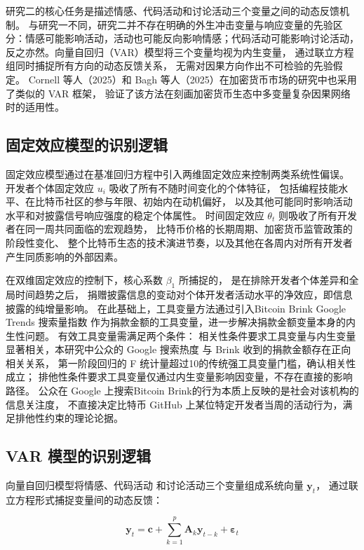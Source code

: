 \documentclass[
    type = master, %
    degree = professional,        %
    decl-page,  %
    twoside,                %
    fontset = fandol %
  ]{njuthesis}
\begin{document}
研究二的核心任务是描述情感、代码活动和讨论活动三个变量之间的动态反馈机制。
与研究一不同，研究二并不存在明确的外生冲击变量与响应变量的先验区分：情感可能影响活动，活动也可能反向影响情感；代码活动可能影响讨论活动，反之亦然。向量自回归（VAR）模型将三个变量均视为内生变量，
通过联立方程组同时捕捉所有方向的动态反馈关系，
无需对因果方向作出不可检验的先验假定\cite{sims1980macroeconomics}。
Cornell 等人（2025）\cite{cornell2025vector}和 Bagh 等人（2025）\cite{bagh2025investor}在加密货币市场的研究中也采用了类似的 VAR 框架，
验证了该方法在刻画加密货币生态中多变量复杂因果网络时的适用性\cite{cornell2025vector}。

\subsection{固定效应模型的识别逻辑}

固定效应模型通过在基准回归方程中引入两维固定效应来控制两类系统性偏误。
开发者个体固定效应 $u_i$ 吸收了所有不随时间变化的个体特征，
包括编程技能水平、在比特币社区的参与年限、初始内在动机偏好，
以及其他可能同时影响活动水平和对披露信号响应强度的稳定个体属性。
时间固定效应 $\theta_t$ 则吸收了所有开发者在同一周共同面临的宏观趋势，
比特币价格的长期周期、加密货币监管政策的阶段性变化、
整个比特币生态的技术演进节奏，以及其他在各周内对所有开发者产生同质影响的外部因素。

在双维固定效应的控制下，核心系数 $\beta_1$ 所捕捉的，
是在排除开发者个体差异和全局时间趋势之后，
捐赠披露信息的变动对个体开发者活动水平的净效应，即信息披露的纯增量影响。
在此基础上，工具变量方法通过引入Bitcoin Brink Google Trends 搜索量指数
作为捐款金额的工具变量，进一步解决捐款金额变量本身的内生性问题。
有效工具变量需满足两个条件：
相关性条件要求工具变量与内生变量显著相关，本研究中公众的 Google 搜索热度
与 Brink 收到的捐款金额存在正向相关关系，
第一阶段回归的 F 统计量超过10的传统强工具变量门槛，确认相关性成立；
排他性条件要求工具变量仅通过内生变量影响因变量，不存在直接的影响路径。
公众在 Google 上搜索Bitcoin Brink的行为本质上反映的是社会对该机构的信息关注度，
不直接决定比特币 GitHub 上某位特定开发者当周的活动行为，满足排他性约束的理论论据。

\subsection{VAR 模型的识别逻辑}

向量自回归模型将情感、代码活动
和讨论活动三个变量组成系统向量 $\mathbf{y}_t$，
通过联立方程形式捕捉变量间的动态反馈：

\begin{equation}
\label{eq:var-overview}
\mathbf{y}_t = \mathbf{c} + \sum_{k=1}^{p} \mathbf{A}_k \mathbf{y}_{t-k} + \boldsymbol{\varepsilon}_t
\end{equation}
\end{document}

